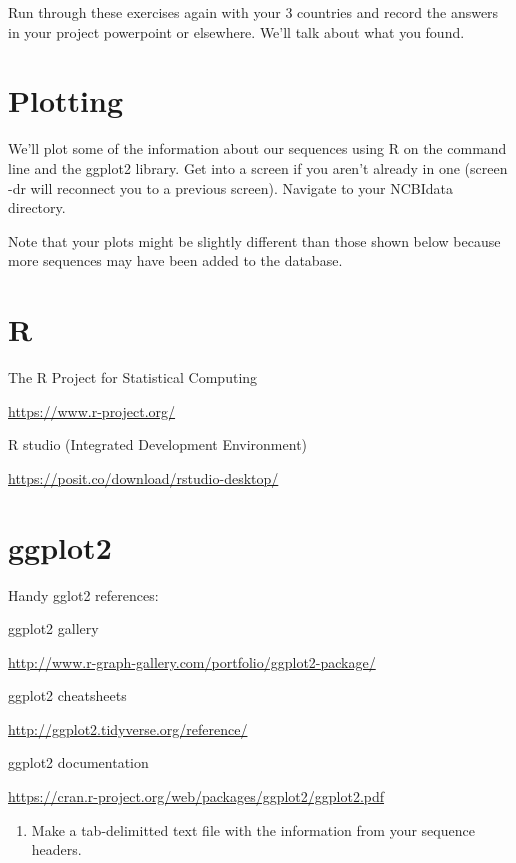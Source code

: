 \documentclass[
]{book}
\providecommand{\tightlist}{%
  \setlength{\itemsep}{0pt}\setlength{\parskip}{0pt}}
\begin{document}
Run through these exercises again with your 3 countries and record the answers in your project powerpoint or elsewhere. We'll talk about what you found.

\hypertarget{plotting}{%
\section{Plotting}\label{plotting}}

We'll plot some of the information about our sequences using R on the command line and the ggplot2 library. Get into a screen if you aren't already in one (screen -dr will reconnect you to a previous screen). Navigate to your NCBIdata directory.

Note that your plots might be slightly different than those shown below because more sequences may have been added to the database.

\hypertarget{r}{%
\section{R}\label{r}}

The R Project for Statistical Computing

\url{https://www.r-project.org/}

R studio (Integrated Development Environment)

\url{https://posit.co/download/rstudio-desktop/}

\hypertarget{ggplot2}{%
\section{ggplot2}\label{ggplot2}}

Handy gglot2 references:

ggplot2 gallery

\url{http://www.r-graph-gallery.com/portfolio/ggplot2-package/}

ggplot2 cheatsheets

\url{http://ggplot2.tidyverse.org/reference/}

ggplot2 documentation

\url{https://cran.r-project.org/web/packages/ggplot2/ggplot2.pdf}

\begin{enumerate}
\def\labelenumi{\arabic{enumi}.}
\setcounter{enumi}{10}
\tightlist
\item
  Make a tab-delimitted text file with the information from your sequence headers.
\end{enumerate}
\end{document}
